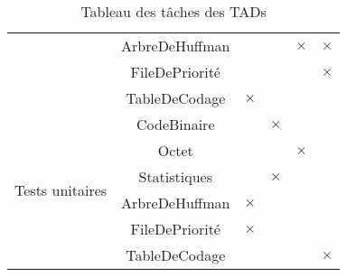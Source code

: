 \begin{table}[ht]
\begin{tabular}{|c|c|>{\centering\arraybackslash}p{1.5cm}|>{\centering\arraybackslash}p{1.5cm}|>{\centering\arraybackslash}p{1.5cm}|>{\centering\arraybackslash}p{1.5cm}|}
        \cline{2-6}
        & ArbreDeHuffman & & & $\times$ & $\times$ \\
        \cline{2-6}
        & FileDePriorité & & & & $\times$ \\
        \cline{2-6}
        & TableDeCodage & $\times$ & & & \\
        \hline
        \multirow{7}{*}{Tests unitaires}
        & CodeBinaire & & $\times$ & & \\
        \cline{2-6}
        & Octet & & & $\times$ & \\
        \cline{2-6}
        & Statistiques & & $\times$ & & \\
        \cline{2-6}
        & ArbreDeHuffman & $\times$ & & & \\
        \cline{2-6}
        & FileDePriorité & $\times$ & & & \\
        \cline{2-6}
        & TableDeCodage & & & & $\times$ \\
        \hline
    \end{tabular}
    \caption{Tableau des tâches des TADs}
\end{table}